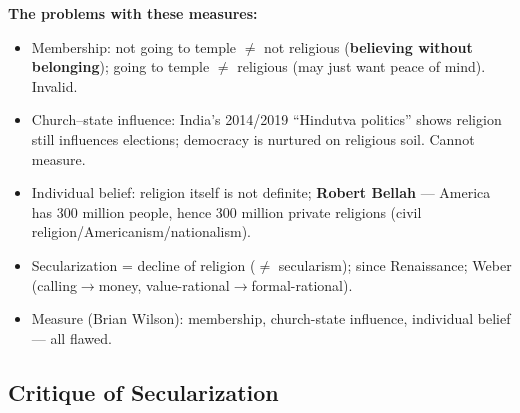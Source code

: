 \begin{CriticalPoint}
\textbf{The problems with these measures:}
\begin{itemize}
\item Membership: not going to temple $\neq$ not religious (\textbf{believing without belonging}); going to temple $\neq$ religious (may just want peace of mind). Invalid.
\item Church--state influence: India's 2014/2019 ``Hindutva politics'' shows religion still influences elections; democracy is nurtured on religious soil. Cannot measure.
\item Individual belief: religion itself is not definite; \textbf{Robert Bellah} --- America has 300 million people, hence 300 million private religions (civil religion/Americanism/nationalism).
\end{itemize}
\end{CriticalPoint}

\begin{QuickRevision}
\begin{itemize}
\item Secularization = decline of religion ($\neq$ secularism); since Renaissance; Weber (calling$\rightarrow$money, value-rational$\rightarrow$formal-rational).
\item Measure (Brian Wilson): membership, church-state influence, individual belief --- all flawed.
\end{itemize}
\end{QuickRevision}

\sectiondivider

\subsection{Critique of Secularization}

